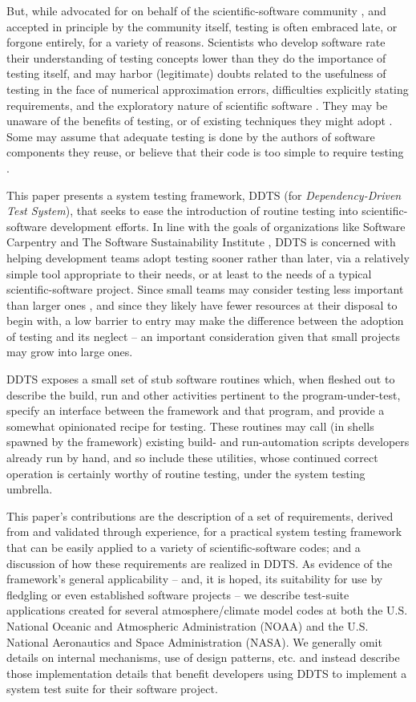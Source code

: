 \documentclass[conference]{IEEEtran}
\begin{document}
But, while advocated for on behalf of the scientific-software community \cite{bp4sc}, and accepted in principle by the community itself, testing is often embraced late, or forgone entirely, for a variety of reasons. Scientists who develop software rate their understanding of testing concepts lower than they do the importance of testing itself, and may harbor (legitimate) doubts related to the usefulness of testing in the face of numerical approximation errors, difficulties explicitly stating requirements, and the exploratory nature of scientific software \cite{how-do}. They may be unaware of the benefits of testing, or of existing techniques they might adopt \cite{bottleneck}. Some may assume that adequate testing is done by the authors of software components they reuse, or believe that their code is too simple to require testing \cite{comp-sci-survey}.

This paper presents a system testing framework, DDTS (for \emph{Dependency-Driven Test System}), that seeks to ease the introduction of routine testing into scientific-software development efforts. In line with the goals of organizations like Software Carpentry \cite{sw-carp} and The Software Sustainability Institute \cite{ssi}, DDTS is concerned with helping development teams adopt testing sooner rather than later, via a relatively simple tool appropriate to their needs, or at least to the needs of a typical scientific-software project. Since small teams may consider testing less important than larger ones \cite{how-do}, and since they likely have fewer resources at their disposal to begin with, a low barrier to entry may make the difference between the adoption of testing and its neglect -- an important consideration given that small projects may grow into large ones.

DDTS exposes a small set of stub software routines which, when fleshed out to describe the build, run and other activities pertinent to the program-under-test, specify an interface between the framework and that program, and provide a somewhat opinionated recipe for testing. These routines may call (in shells spawned by the framework) existing build- and run-automation scripts developers already run by hand, and so include these utilities, whose continued correct operation is certainly worthy of routine testing, under the system testing umbrella.

This paper's contributions are the description of a set of requirements, derived from and validated through experience, for a practical system testing framework that can be easily applied to a variety of scientific-software codes; and a discussion of how these requirements are realized in DDTS. As evidence of the framework's general applicability -- and, it is hoped, its suitability for use by fledgling or even established software projects -- we describe test-suite applications created for several atmosphere/climate model codes at both the U.S. National Oceanic and Atmospheric Administration (NOAA) and the U.S. National Aeronautics and Space Administration (NASA). We generally omit details on internal mechanisms, use of design patterns, etc. and instead describe those implementation details that benefit developers using DDTS to implement a system test suite for their software project.
\end{document}
